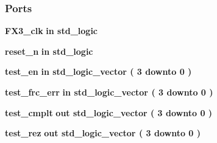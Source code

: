 \subsubsection*{Ports}
 \begin{DoxyCompactItemize}
\item 
{\bf F\+X3\+\_\+clk}  {\bfseries {\bfseries \textcolor{keywordflow}{in}\textcolor{vhdlchar}{ }}} {\bfseries \textcolor{comment}{std\+\_\+logic}\textcolor{vhdlchar}{ }} 
\item 
{\bf reset\+\_\+n}  {\bfseries {\bfseries \textcolor{keywordflow}{in}\textcolor{vhdlchar}{ }}} {\bfseries \textcolor{comment}{std\+\_\+logic}\textcolor{vhdlchar}{ }} 
\item 
{\bf test\+\_\+en}  {\bfseries {\bfseries \textcolor{keywordflow}{in}\textcolor{vhdlchar}{ }}} {\bfseries \textcolor{comment}{std\+\_\+logic\+\_\+vector}\textcolor{vhdlchar}{ }\textcolor{vhdlchar}{(}\textcolor{vhdlchar}{ }\textcolor{vhdlchar}{ } \textcolor{vhdldigit}{3} \textcolor{vhdlchar}{ }\textcolor{keywordflow}{downto}\textcolor{vhdlchar}{ }\textcolor{vhdlchar}{ } \textcolor{vhdldigit}{0} \textcolor{vhdlchar}{ }\textcolor{vhdlchar}{)}\textcolor{vhdlchar}{ }} 
\item 
{\bf test\+\_\+frc\+\_\+err}  {\bfseries {\bfseries \textcolor{keywordflow}{in}\textcolor{vhdlchar}{ }}} {\bfseries \textcolor{comment}{std\+\_\+logic\+\_\+vector}\textcolor{vhdlchar}{ }\textcolor{vhdlchar}{(}\textcolor{vhdlchar}{ }\textcolor{vhdlchar}{ } \textcolor{vhdldigit}{3} \textcolor{vhdlchar}{ }\textcolor{keywordflow}{downto}\textcolor{vhdlchar}{ }\textcolor{vhdlchar}{ } \textcolor{vhdldigit}{0} \textcolor{vhdlchar}{ }\textcolor{vhdlchar}{)}\textcolor{vhdlchar}{ }} 
\item 
{\bf test\+\_\+cmplt}  {\bfseries {\bfseries \textcolor{keywordflow}{out}\textcolor{vhdlchar}{ }}} {\bfseries \textcolor{comment}{std\+\_\+logic\+\_\+vector}\textcolor{vhdlchar}{ }\textcolor{vhdlchar}{(}\textcolor{vhdlchar}{ }\textcolor{vhdlchar}{ } \textcolor{vhdldigit}{3} \textcolor{vhdlchar}{ }\textcolor{keywordflow}{downto}\textcolor{vhdlchar}{ }\textcolor{vhdlchar}{ } \textcolor{vhdldigit}{0} \textcolor{vhdlchar}{ }\textcolor{vhdlchar}{)}\textcolor{vhdlchar}{ }} 
\item 
{\bf test\+\_\+rez}  {\bfseries {\bfseries \textcolor{keywordflow}{out}\textcolor{vhdlchar}{ }}} {\bfseries \textcolor{comment}{std\+\_\+logic\+\_\+vector}\textcolor{vhdlchar}{ }\textcolor{vhdlchar}{(}\textcolor{vhdlchar}{ }\textcolor{vhdlchar}{ } \textcolor{vhdldigit}{3} \textcolor{vhdlchar}{ }\textcolor{keywordflow}{downto}\textcolor{vhdlchar}{ }\textcolor{vhdlchar}{ } \textcolor{vhdldigit}{0} \textcolor{vhdlchar}{ }\textcolor{vhdlchar}{)}\textcolor{vhdlchar}{ }} 

\end{DoxyCompactItemize}
